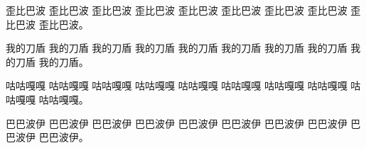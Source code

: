 \begin{acknowledgment}
歪比巴波 歪比巴波 歪比巴波 歪比巴波 歪比巴波 歪比巴波 歪比巴波 歪比巴波 歪比巴波 歪比巴波。

我的刀盾 我的刀盾 我的刀盾 我的刀盾 我的刀盾 我的刀盾 我的刀盾 我的刀盾 我的刀盾 我的刀盾。

咕咕嘎嘎 咕咕嘎嘎 咕咕嘎嘎 咕咕嘎嘎 咕咕嘎嘎 咕咕嘎嘎 咕咕嘎嘎 咕咕嘎嘎 咕咕嘎嘎 咕咕嘎嘎。

巴巴波伊 巴巴波伊 巴巴波伊 巴巴波伊 巴巴波伊 巴巴波伊 巴巴波伊 巴巴波伊 巴巴波伊 巴巴波伊。
\end{acknowledgment}
